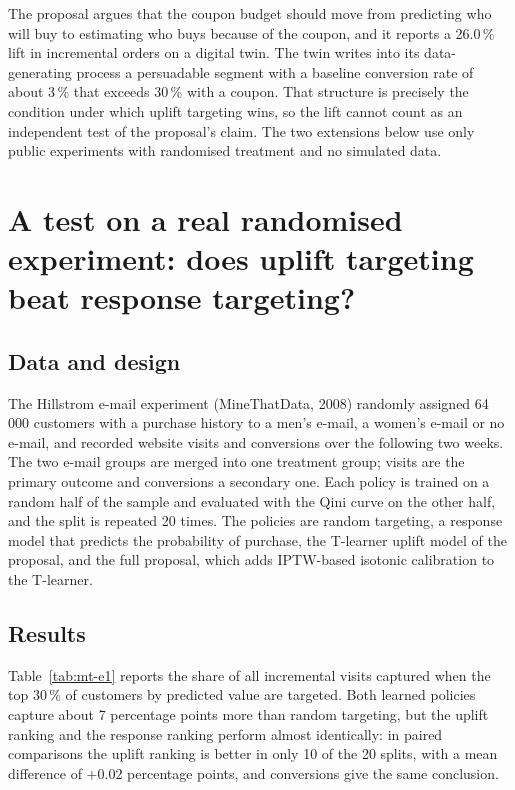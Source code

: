 The proposal argues that the coupon budget should move from predicting who will buy to estimating who buys because of the coupon, and it reports a 26.0\,\% lift in incremental orders on a digital twin. The twin writes into its data-generating process a persuadable segment with a baseline conversion rate of about 3\,\% that exceeds 30\,\% with a coupon. That structure is precisely the condition under which uplift targeting wins, so the lift cannot count as an independent test of the proposal's claim. The two extensions below use only public experiments with randomised treatment and no simulated data.

\section{A test on a real randomised experiment: does uplift targeting beat response targeting?}

\subsection{Data and design}
The Hillstrom e-mail experiment (MineThatData, 2008) randomly assigned 64\,000 customers with a purchase history to a men's e-mail, a women's e-mail or no e-mail, and recorded website visits and conversions over the following two weeks\cite{hillstrom2008}. The two e-mail groups are merged into one treatment group; visits are the primary outcome and conversions a secondary one. Each policy is trained on a random half of the sample and evaluated with the Qini curve on the other half, and the split is repeated 20 times. The policies are random targeting, a response model that predicts the probability of purchase, the T-learner uplift model of the proposal, and the full proposal, which adds IPTW-based isotonic calibration to the T-learner.

\subsection{Results}
Table~\ref{tab:mt-e1} reports the share of all incremental visits captured when the top 30\,\% of customers by predicted value are targeted. Both learned policies capture about 7 percentage points more than random targeting, but the uplift ranking and the response ranking perform almost identically: in paired comparisons the uplift ranking is better in only 10 of the 20 splits, with a mean difference of $+0.02$ percentage points, and conversions give the same conclusion.


